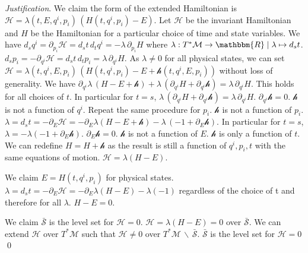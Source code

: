 \documentclass[aps,pra,10pt,twocolumn,floatfix,nofootinbib]{revtex4-1}
\numberwithin{equation}{section}
\theoremstyle{definition}
\newenvironment{justification}{\emph{Justification}.}{\qed}
\begin{document}
\begin{justification}
	We claim the form of the extended Hamiltonian is $\mathcal{H} = \lambda(t,E,q^i,p_i) \, (H(t,q^i,p_i) - E)$. Let $\mathcal{H}$ be the invariant Hamiltonian and $H$ be the Hamiltonian for a particular choice of time and state variables. We have $d_s q^i = \partial_{p_i} \mathcal{H} = d_s t \, d_t q^i = - \lambda \, \partial_{p_i} H$ where $\lambda : T^*\mathcal{M} \rightarrow \mathbbm{R} \; | \; \lambda \mapsto d_s t$. $d_s p_i = - \partial_{q^i} \mathcal{H} = d_s t \, d_t p_i = \lambda \, \partial_{q^i} H$. As $\lambda \neq 0$ for all physical states, we can set $\mathcal{H} = \lambda(t,q^i,E,p_i) \, (H(t,q^i,p_i) - E + \mathcal{h}(t,q^i,E,p_i))$ without loss of generality. We have $\partial_{q^i} \lambda \, (H - E + \mathcal{h}) + \lambda \, (\partial_{q^i} H + \partial_{q^i} \mathcal{h}) = \lambda \, \partial_{q^i} H$. This holds for all choices of $t$. In particular for $t=s$, $\lambda \, (\partial_{q^i} H + \partial_{q^i} \mathcal{h}) = \lambda \, \partial_{q^i} H$. $\partial_{q^i} \mathcal{h} = 0$. $\mathcal{h}$ is not a function of $q^i$. Repeat the same procedure for $p_i$. $\mathcal{h}$ is not a function of $p_i$. $\lambda = d_s t = - \partial_E \mathcal{H} = - \partial_{E} \lambda (H - E + \mathcal{h}) - \lambda \, (-1 + \partial_{E} \mathcal{h})$. In particular for $t=s$, $\lambda = - \lambda (-1 + \partial_{E} \mathcal{h})$. $\partial_{E} \mathcal{h} = 0$. $\mathcal{h}$ is not a function of $E$. $\mathcal{h}$ is only a function of $t$. We can redefine $H = H + \mathcal{h}$ as the result is still a function of $q^i, p_i , t$ with the same equations of motion. $\mathcal{H}=\lambda (H - E)$.
	
	We claim $E = H(t,q^i,p_i)$ for physical states. $\lambda = d_s t = - \partial_E \mathcal{H} = - \partial_{E} \lambda (H - E) - \lambda (-1)$ regardless of the choice of t and therefore for all $\lambda$. $H - E = 0$. 
	
	We claim $\bar{\mathcal{S}}$ is the level set for $\mathcal{H} = 0$. $\mathcal{H} = \lambda (H - E) = 0$ over $\bar{\mathcal{S}}$. We can extend $\mathcal{H}$ over $T^* \mathcal{M}$ such that $\mathcal{H} \neq 0$ over $T^*\mathcal{M} \,\backslash\, \bar{\mathcal{S}}$. $\bar{\mathcal{S}}$ is the level set for $\mathcal{H} = 0$
\end{justification}
\end{document}
